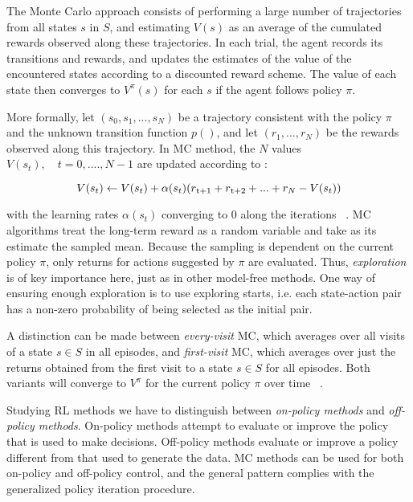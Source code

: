 The Monte Carlo approach consists of performing a large number of trajectories from all states $s$ in $S$, and estimating $V(s)$ as an average of the cumulated rewards observed along these trajectories. In each trial, the agent records its transitions and rewards, and updates the estimates of the value of the  encountered states according to a discounted reward scheme. The value of each state then converges to $V^\pi (s)$ for each $s$ if the agent follows policy $\pi$.

More formally, let $(s_0, s_1, ..., s_N)$ be a trajectory consistent with the policy $\pi$ and the unknown transition function $p()$, and let $(r_1, ..., r_N)$ be the rewards observed along this trajectory. In MC method, the $N$ values $V(s_t), \quad t = 0, ...., N-1$ are updated according to :

\begin{equation} 
\label{eq:2.6}
V(s_t) \leftarrow V(s_t) + \alpha(s_t)(r\textsubscript{t+1} + r\textsubscript{t+2} + ... + r_N - V(s_t))
\end{equation}

with the learning rates $\alpha(s_t)$ converging to $0$ along the iterations~\cite{Sigaud:2010:MDP:1841781} . MC algorithms treat the long-term reward as a random variable and take as its estimate the sampled mean. Because the sampling is dependent on the current policy $\pi$, only returns for actions suggested by $\pi$ are evaluated. Thus, \textit{exploration} is of key importance here, just as in other model-free methods. One way of ensuring enough exploration is to use exploring starts, i.e. each state-action pair has a non-zero probability of being selected as the initial pair.

A distinction can be made between \textit{every-visit} MC, which averages over all visits of a state $s \in S$ in all episodes, and \textit{first-visit} MC, which averages over just the returns obtained from the first visit to a state $s \in S$ for all episodes. Both variants will
converge to $V^\pi$ for the current policy $\pi$ over time~\cite{wiering2012reinforcement} .

Studying RL methods we have to distinguish between \textit{on-policy methods} and \textit{off-policy methods}.
On-policy methods attempt to evaluate or improve the policy that is used to make decisions. Off-policy methods evaluate or improve a policy different from that used to generate the data. MC methods can be used for both on-policy and off-policy control, and the general pattern complies with the generalized policy iteration procedure. \\ \\

